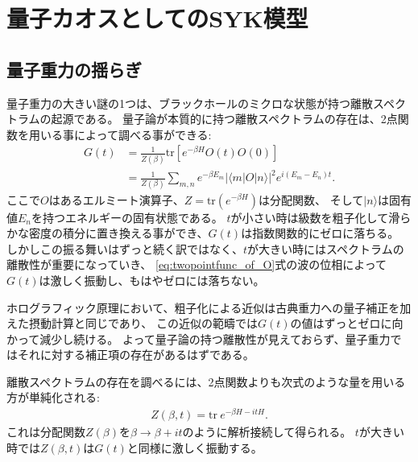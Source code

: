 \section{量子カオスとしてのSYK模型\label{sec:syk_as_quantum_chaos}}

\subsection{量子重力の揺らぎ}
量子重力の大きい謎の1つは、ブラックホールのミクロな状態が持つ離散スペクトラムの起源である。
量子論が本質的に持つ離散スペクトラムの存在は、2点関数を用いる事によって調べる事ができる:
\begin{align}
	G(t)
		&= \frac{1}{Z(\beta)}\mathrm{tr}\left[e^{-\beta H}O(t)O(0)\right]\nonumber\\
		&= \frac{1}{Z(\beta)}\sum_{m, n}e^{-\beta E_m}
			|\langle m|O|n \rangle|^2e^{i(E_m - E_n)t}.
	\label{eq:twopointfunc_of_O}
\end{align}
ここで$O$はあるエルミート演算子、$Z = \mathrm{tr}(e^{-\beta H})$は分配関数、
そして$|n\rangle$は固有値$E_n$を持つエネルギーの固有状態である。
$t$が小さい時は級数を粗子化して滑らかな密度の積分に置き換える事ができ、$G(t)$は指数関数的にゼロに落ちる。
しかしこの振る舞いはずっと続く訳ではなく、$t$が大きい時にはスペクトラムの離散性が重要になっていき、
\eqref{eq:twopointfunc_of_O}式の波の位相によって$G(t)$は激しく振動し、もはやゼロには落ちない。

ホログラフィック原理において、粗子化による近似は古典重力への量子補正を加えた摂動計算と同じであり、
この近似の範疇では$G(t)$の値はずっとゼロに向かって減少し続ける。
よって量子論の持つ離散性が見えておらず、量子重力ではそれに対する補正項の存在があるはずである。

離散スペクトラムの存在を調べるには、2点関数よりも次式のような量を用いる方が単純化される:
\begin{align}
	Z(\beta, t) = \mathrm{tr}\ e^{-\beta H - itH}.
\end{align}
これは分配関数$Z(\beta)$を$\beta\to\beta + it$のように解析接続して得られる。
$t$が大きい時では$Z(\beta, t)$は$G(t)$と同様に激しく振動する。

